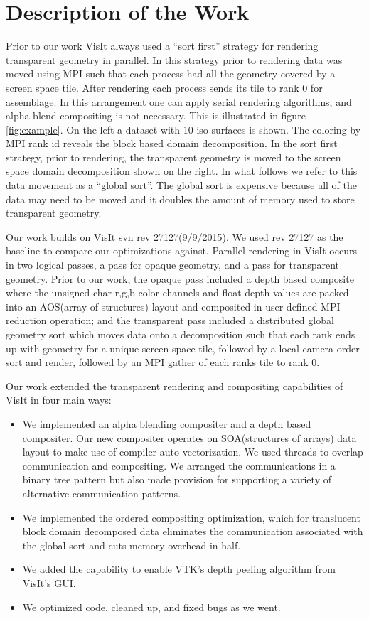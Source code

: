 \documentclass[a4paper,10pt]{report}
\begin{document}
\section{Description of the Work}
Prior to our work VisIt always used a ``sort first'' strategy for rendering transparent geometry in parallel. In this strategy prior to rendering data was moved using MPI such that each process had all the geometry covered by a screen space tile. After rendering each process sends its tile to rank 0 for assemblage. In this arrangement one can apply serial rendering algorithms, and alpha blend compositing is not necessary. This is illustrated in figure \ref{fig:example}. On the left a dataset with 10 iso-surfaces is shown. The coloring by MPI rank id reveals the block based domain decomposition. In the sort first strategy, prior to rendering, the transparent geometry is moved to the screen space domain decomposition shown on the right. In what follows we refer to this data movement as a ``global sort''. The global sort is expensive because all of the data may need to be moved and it doubles the amount of memory used to store transparent geometry.

Our work builds on VisIt svn rev 27127(9/9/2015). We used rev 27127 as the baseline to compare our optimizations against. Parallel rendering in VisIt occurs in two logical passes, a pass for opaque geometry, and a pass for transparent geometry. Prior to our work, the opaque pass included a depth based composite where the unsigned char r,g,b color channels and float depth values are packed into an AOS(array of structures) layout and composited in user defined MPI reduction operation; and the transparent pass included a distributed global geometry sort which moves data onto a decomposition such that each rank ends up with geometry for a unique screen space tile, followed by a local camera order sort and render, followed by an MPI gather of each ranks tile to rank 0.

Our work extended the transparent rendering and compositing capabilities of VisIt in four main ways: 
\begin{itemize}
 \item We implemented an alpha blending compositer and a depth based compositer. Our new compositer operates on SOA(structures of arrays) data layout to make use of compiler auto-vectorization. We used threads to overlap communication and compositing. We arranged the communications in a binary tree pattern but also made provision for supporting a variety of alternative communication patterns.
 \item We implemented the ordered compositing optimization, which for translucent block domain decomposed data eliminates the communication associated with the global sort and cuts memory overhead in half.
 \item We added the capability to enable VTK's depth peeling algorithm from VisIt's GUI.
 \item We optimized code, cleaned up, and fixed bugs as we went.
\end{itemize}
\end{document}

